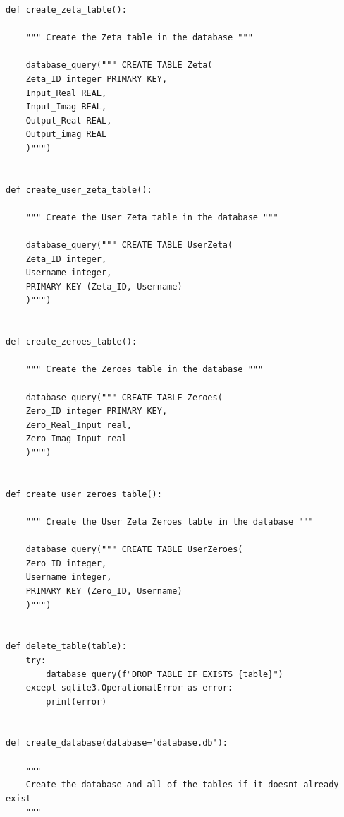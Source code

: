 \documentclass{article}
\begin{document}
\begin{lstlisting}
def create_zeta_table():

    """ Create the Zeta table in the database """

    database_query(""" CREATE TABLE Zeta(
    Zeta_ID integer PRIMARY KEY,
    Input_Real REAL,
    Input_Imag REAL,
    Output_Real REAL,
    Output_imag REAL
    )""")


def create_user_zeta_table():

    """ Create the User Zeta table in the database """

    database_query(""" CREATE TABLE UserZeta(
    Zeta_ID integer,
    Username integer,
    PRIMARY KEY (Zeta_ID, Username)
    )""")


def create_zeroes_table():

    """ Create the Zeroes table in the database """

    database_query(""" CREATE TABLE Zeroes(
    Zero_ID integer PRIMARY KEY,
    Zero_Real_Input real,
    Zero_Imag_Input real
    )""")


def create_user_zeroes_table():

    """ Create the User Zeta Zeroes table in the database """

    database_query(""" CREATE TABLE UserZeroes(
    Zero_ID integer,
    Username integer,
    PRIMARY KEY (Zero_ID, Username)
    )""")


def delete_table(table):
    try:
        database_query(f"DROP TABLE IF EXISTS {table}")
    except sqlite3.OperationalError as error:
        print(error)


def create_database(database='database.db'):

    """
    Create the database and all of the tables if it doesnt already exist
    """


\end{lstlisting}
\end{document}
